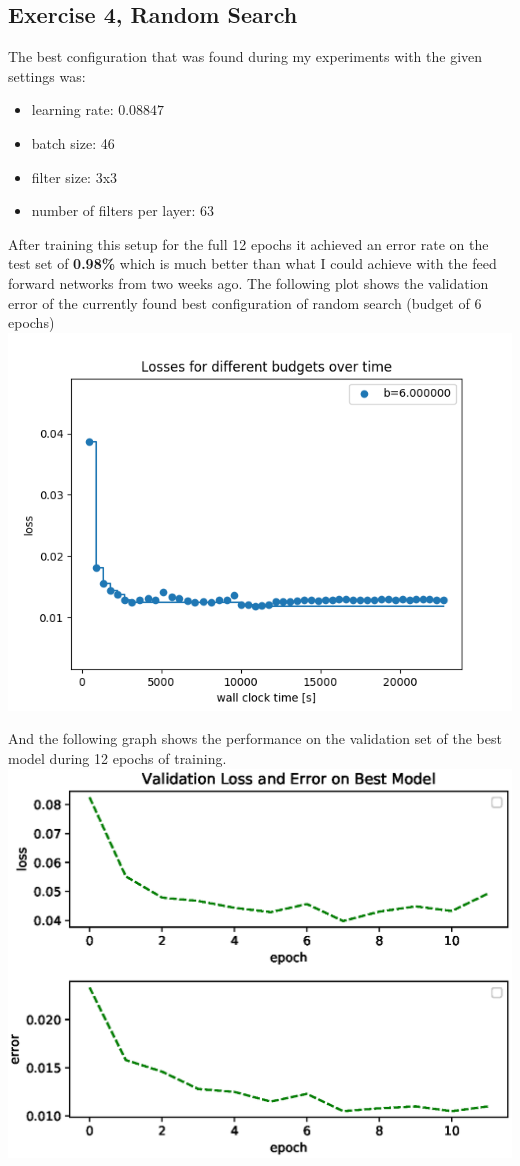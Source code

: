 \documentclass{scrartcl}
\begin{document}
\subsection*{Exercise 4, Random Search}
The best configuration that was found during my experiments with the given settings was:
\begin{itemize}
	\item learning rate: $0.08847$
	\item batch size: 46
	\item filter size: 3x3
	\item number of filters per layer: 63
\end{itemize}
After training this setup for the full 12 epochs it achieved an error rate on the test set of \textbf{0.98\%} which is much better than what I could achieve with the feed forward networks from two weeks ago. The following plot shows the
validation error of the currently found best configuration of random search (budget of 6 epochs)\\
\includegraphics[scale=0.7]{random_result.png}

And the following graph shows the performance on the validation set of the best model during 12 epochs of training. \\
\includegraphics[scale=1]{randomPerformance.eps}
\end{document}
